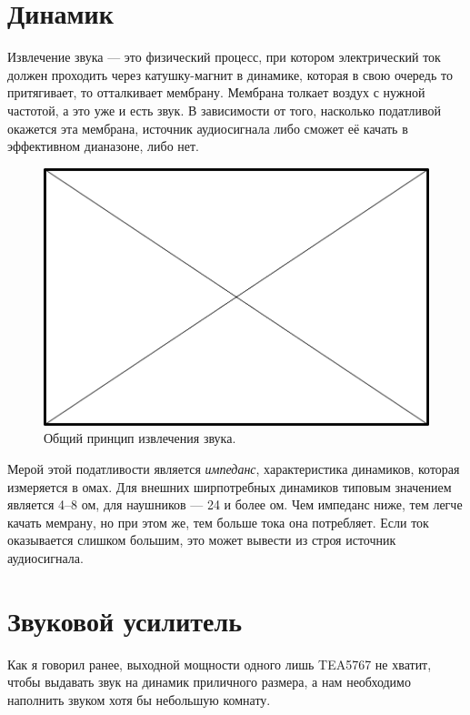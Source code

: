 \section{Динамик}


Извлечение звука — это физический процесс, при котором электрический ток должен проходить через катушку-магнит в динамике, которая в свою очередь то притягивает, то отталкивает мембрану. Мембрана толкает воздух с нужной частотой, а это уже и есть звук. В зависимости от того, насколько податливой окажется эта мембрана, источник аудиосигнала либо сможет её качать в эффективном дианазоне, либо нет.

\begin{figure}
  \centering
  \includegraphics{TODO.png}
  \caption{Общий принцип извлечения звука.}
\end{figure}

Мерой этой податливости является \emph{импеданс}, характеристика динамиков, которая измеряется в омах. Для внешних ширпотребных динамиков типовым значением является 4--8 ом, для наушников — 24 и более ом. Чем импеданс ниже, тем легче качать мемрану, но при этом же, тем больше тока она потребляет. Если ток оказывается слишком большим, это может вывести из строя источник аудиосигнала.

\section{Звуковой усилитель}

Как я говорил ранее, выходной мощности одного лишь TEA5767 не хватит, чтобы выдавать звук на динамик приличного размера, а нам необходимо наполнить звуком хотя бы небольшую комнату.

